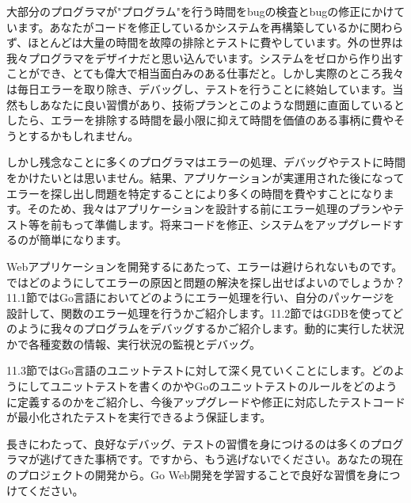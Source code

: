大部分のプログラマが"プログラム"を行う時間をbugの検査とbugの修正にかけています。あなたがコードを修正しているかシステムを再構築しているかに関わらず、ほとんどは大量の時間を故障の排除とテストに費やしています。外の世界は我々プログラマをデザイナだと思い込んでいます。システムをゼロから作り出すことができ、とても偉大で相当面白みのある仕事だと。しかし実際のところ我々は毎日エラーを取り除き、デバッグし、テストを行うことに終始しています。当然もしあなたに良い習慣があり、技術プランとこのような問題に直面しているとしたら、エラーを排除する時間を最小限に抑えて時間を価値のある事柄に費やそうとするかもしれません。

しかし残念なことに多くのプログラマはエラーの処理、デバッグやテストに時間をかけたいとは思いません。結果、アプリケーションが実運用された後になってエラーを探し出し問題を特定することにより多くの時間を費やすことになります。そのため、我々はアプリケーションを設計する前にエラー処理のプランやテスト等を前もって準備します。将来コードを修正、システムをアップグレードするのが簡単になります。

Webアプリケーションを開発するにあたって、エラーは避けられないものです。ではどのようにしてエラーの原因と問題の解決を探し出せばよいのでしょうか？ 11.1節ではGo言語においてどのようにエラー処理を行い、自分のパッケージを設計して、関数のエラー処理を行うかご紹介します。11.2節ではGDBを使ってどのように我々のプログラムをデバッグするかご紹介します。動的に実行した状況かで各種変数の情報、実行状況の監視とデバッグ。

11.3節ではGo言語のユニットテストに対して深く見ていくことにします。どのようにしてユニットテストを書くのかやGoのユニットテストのルールをどのように定義するのかをご紹介し、今後アップグレードや修正に対応したテストコードが最小化されたテストを実行できるよう保証します。

長きにわたって、良好なデバッグ、テストの習慣を身につけるのは多くのプログラマが逃げてきた事柄です。ですから、もう逃げないでください。あなたの現在のプロジェクトの開発から。Go Web開発を学習することで良好な習慣を身につけてください。
